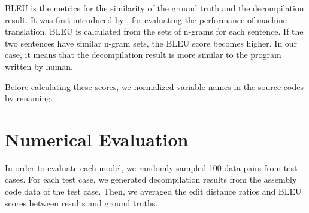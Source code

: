\documentclass[senior,final,11pt]{iscs-thesis}
\begin{document}
BLEU is the metrics for the similarity of the ground truth and the decompilation result. 
It was first introduced by \citet{BLEU}, for evaluating the performance of machine translation.
BLEU is calculated from the sets of n-grams for each sentence. 
If the two sentences have similar n-gram sets, the BLEU score becomes higher.
In our case, it means that the decompilation result is more similar to the program written by human. %


Before calculating these scores, we normalized variable names in the source codes by renaming.









\section{Numerical Evaluation}
In order to evaluate each model, we randomly sampled 100 data pairs from test cases.
For each test case, we generated decompilation results from the assembly code data of the test case.
Then, we averaged the edit distance ratios and BLEU scores between results and ground truths.
\end{document}
